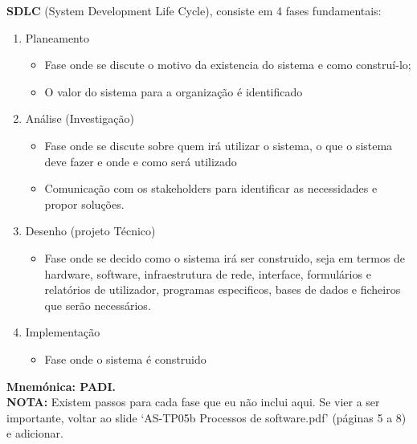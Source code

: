 \documentclass[a4paper, 12pt, onecolumn, oneside]{scrartcl}
\begin{document}
\textbf{SDLC} (System Development Life Cycle), consiste em 4 fases fundamentais:
\begin{enumerate}
  \item Planeamento
  \begin{itemize}
    \item Fase onde se discute o motivo da existencia do sistema e como construí-lo;
    \item O valor do sistema para a organização é identificado
  \end{itemize}  
  \item Análise (Investigação)
  \begin{itemize}
    \item Fase onde se discute sobre quem irá utilizar o sistema, o que o sistema deve fazer e onde e como será utilizado
    \item Comunicação com os stakeholders para identificar as necessidades e propor soluções.
  \end{itemize}  
  \item Desenho (projeto Técnico)
  \begin{itemize}
    \item Fase onde se decido como o sistema irá ser construido, seja em termos de hardware, software, infraestrutura de rede,
    interface, formulários e relatórios de utilizador, programas especificos, bases de dados e ficheiros que serão necessários.
  \end{itemize}  
  \item Implementação
  \begin{itemize}
    \item Fase onde o sistema é construido
  \end{itemize}  
\end{enumerate}
\textbf{Mnemónica: PADI.}\\
\textbf{NOTA:} Existem passos para cada fase que eu não inclui aqui. Se vier a ser importante, voltar ao slide
`AS-TP05b Processos de software.pdf' (páginas 5 a 8) e adicionar. 
\end{document}
